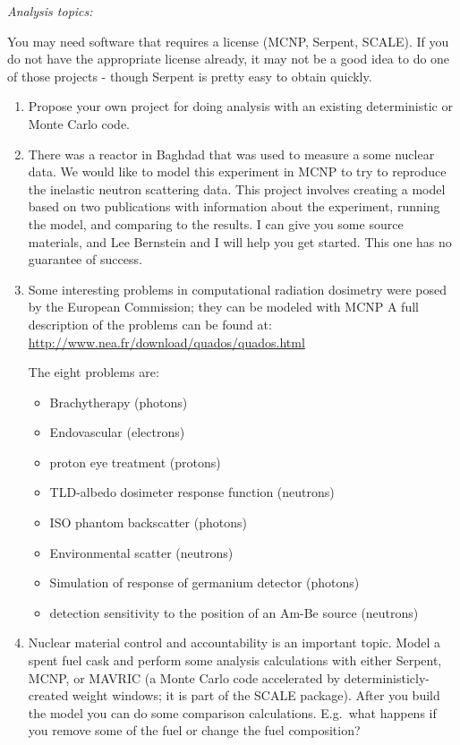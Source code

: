 \documentclass[12pt]{article}
\begin{document}
\begin{center}
\textit{Analysis topics:}
\end{center}
You may need software that requires a license (MCNP, Serpent, SCALE). If you do not have the appropriate license already, it may not be a good idea to do one of those projects - though Serpent is pretty easy to obtain quickly.

\begin{enumerate}
\item Propose your own project for doing analysis with an existing deterministic or Monte Carlo code. 

\item There was a reactor in Baghdad that was used to measure a some nuclear data. We would like to model this experiment in MCNP to try to reproduce the inelastic neutron scattering data. This project involves creating a model based on two publications with information about the experiment, running the model, and comparing to the results. I can give you some source materials, and Lee Bernstein and I will help you get started. This one has no guarantee of success.  

\item Some interesting problems in computational radiation dosimetry were posed by the European Commission; they can be modeled with MCNP A full description of the problems can be found at: \href{http://www.nea.fr/download/quados/quados.html}{http://www.nea.fr/download/quados/quados.html}

The eight problems are: 
\begin{itemize}
\item Brachytherapy (photons)
\item Endovascular (electrons)
\item proton eye treatment (protons)
\item TLD-albedo dosimeter response function (neutrons)
\item ISO phantom backscatter (photons)
\item Environmental scatter (neutrons)
\item Simulation of response of germanium detector (photons)
\item detection sensitivity to the position of an Am-Be source (neutrons)
\end{itemize}	

\item Nuclear material control and accountability is an important topic. Model a spent fuel cask and perform some analysis calculations with either Serpent, MCNP, or MAVRIC (a Monte Carlo code accelerated by deterministicly-created weight windows; it is part of the SCALE package). After you build the model you can do some comparison calculations. E.g.\ what happens if you remove some of the fuel or change the fuel composition?
\end{enumerate}
\end{document}

